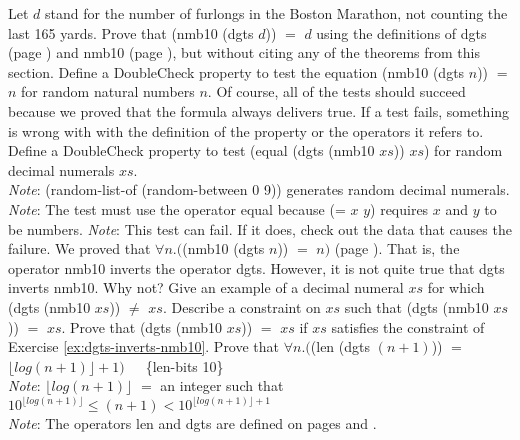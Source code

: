 \begin{ExerciseList}
\Exercise Let $d$ stand for the number of furlongs in
     the Boston Marathon, not counting the last 165 yards.
     Prove that \textsf{(nmb10 (dgts $d$))} $=$ $d$
     using the definitions of \textsf{dgts} (page \pageref{dgts-defun})
     and \textsf{nmb10} (page \pageref{nmb10-defun}),
     but without citing any of the theorems from this section.
\Exercise Define a DoubleCheck property to test
     the equation \textsf{(nmb10 (dgts $n$))} $=$ $n$ for random
     natural numbers $n$.
     Of course, all of the tests should succeed because
     we proved that the formula always delivers true.
     If a test fails, something is wrong with
     with the definition of the property or the operators it refers to.
\Exercise Define a DoubleCheck property to test
     \textsf{(equal (dgts (nmb10 $xs$)) $xs$)} for random
     decimal numerals $xs$.\\
     \emph{Note}: \textsf{(random-list-of (random-between 0 9))}
     generates random decimal numerals.\\
     \emph{Note}: The test must use the operator
     \textsf{equal} because \textsf{(= $x$ $y$)}
     requires $x$ and $y$ to be numbers.
     \emph{Note}: This test can fail.
     If it does, check out the data that causes the failure.
\Exercise We proved that
     $\forall n. ($\textsf{(nmb10 (dgts $n$))} $=$ $n)$ (page \pageref{dgts-ok}).
     That is, the operator \textsf{nmb10}
     inverts the operator \textsf{dgts}.
     However, it is not quite true that \textsf{dgts} inverts \textsf{nmb10}.
     Why not? Give an example of a decimal numeral
     $xs$ for which \textsf{(dgts (nmb10 $xs$))} $\neq$ $xs$.
\Exercise \label{ex:dgts-inverts-nmb10}
     Describe a constraint on $xs$ such that
     \textsf{(dgts (nmb10 $xs$))} $=$ $xs$.
\Exercise Prove that
    \textsf{(dgts (nmb10 $xs$))} $=$ $xs$
     if $xs$ satisfies the constraint of Exercise \ref{ex:dgts-inverts-nmb10}.
\Exercise Prove that
    $\forall n.($\textsf{(len (dgts $(n+1)$))} $=$ $\lfloor log(n+1) \rfloor + 1)$~~~\{len-bits 10\}\\
    \hspace*{16mm}\emph{Note}: $\lfloor log(n+1) \rfloor$ $=$ an integer such that
    $10^{\lfloor log(n+1) \rfloor} \le (n+1) < 10^{\lfloor log(n+1) \rfloor + 1}$\\
    \hspace*{16mm}\emph{Note}: The operators \textsf{len} and \textsf{dgts}
    are defined on pages \pageref{len-equations} and \pageref{dgts-defun}.

\end{ExerciseList}

